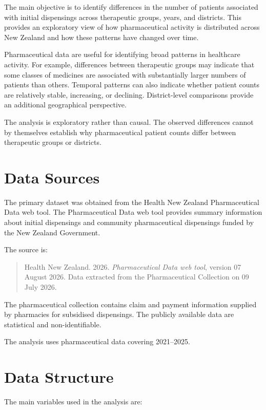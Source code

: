 \documentclass[11pt,a4paper]{report}
\begin{document}
The main objective is to identify differences in the number of patients associated with initial dispensings across therapeutic groups, years, and districts. This provides an exploratory view of how pharmaceutical activity is distributed across New Zealand and how these patterns have changed over time.

Pharmaceutical data are useful for identifying broad patterns in healthcare activity. For example, differences between therapeutic groups may indicate that some classes of medicines are associated with substantially larger numbers of patients than others. Temporal patterns can also indicate whether patient counts are relatively stable, increasing, or declining. District-level comparisons provide an additional geographical perspective.

The analysis is exploratory rather than causal. The observed differences cannot by themselves establish why pharmaceutical patient counts differ between therapeutic groups or districts.


\section{Data Sources}

The primary dataset was obtained from the Health New Zealand Pharmaceutical Data web tool. The Pharmaceutical Data web tool provides summary information about initial dispensings and community pharmaceutical dispensings funded by the New Zealand Government.

The source is:

\begin{quote}
Health New Zealand. 2026. \textit{Pharmaceutical Data web tool}, version 07 August 2026. Data extracted from the Pharmaceutical Collection on 09 July 2026.
\end{quote}

The pharmaceutical collection contains claim and payment information supplied by pharmacies for subsidised dispensings. The publicly available data are statistical and non-identifiable.

The analysis uses pharmaceutical data covering 2021--2025.


\section{Data Structure}

The main variables used in the analysis are:
\end{document}
